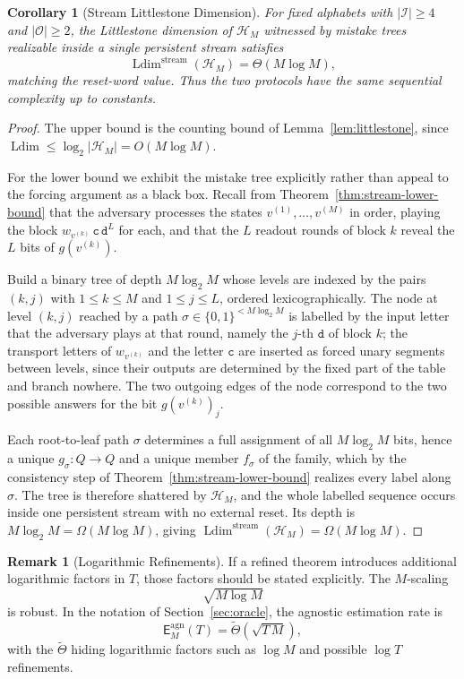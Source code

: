 \documentclass[12pt]{article}
\newtheorem{corollary}[theorem]{Corollary}
\theoremstyle{definition}
\newtheorem{remark}[theorem]{Remark}
\DeclareMathOperator{\Ldim}{Ldim}
\newcommand{\Est}{\mathsf E}
\begin{document}
\begin{corollary}[Stream Littlestone Dimension]
\label{cor:stream-ldim}
For fixed alphabets with $|\mathcal I|\ge4$ and $|\mathcal O|\ge2$, the
Littlestone dimension of $\mathcal H_M$ witnessed by mistake trees realizable
inside a single persistent stream satisfies
\[
\Ldim^{\mathrm{stream}}(\mathcal H_M)
=
\Theta(M\log M),
\]
matching the reset-word value.  Thus the two protocols have the same
sequential complexity up to constants.
\end{corollary}

\begin{proof}
The upper bound is the counting bound of Lemma~\ref{lem:littlestone}, since
$\Ldim\le\log_2|\mathcal H_M|=O(M\log M)$.

For the lower bound we exhibit the mistake tree explicitly rather than appeal
to the forcing argument as a black box.  Recall from
Theorem~\ref{thm:stream-lower-bound} that the adversary processes the states
$v^{(1)},\dots,v^{(M)}$ in order, playing the block
$w_{v^{(k)}}\,\mathtt c\,\mathtt d^{L}$ for each, and that the $L$ readout
rounds of block $k$ reveal the $L$ bits of $g(v^{(k)})$.

Build a binary tree of depth $M\log_2M$ whose levels are indexed by the pairs
$(k,j)$ with $1\le k\le M$ and $1\le j\le L$, ordered lexicographically.  The
node at level $(k,j)$ reached by a path $\sigma\in\{0,1\}^{<M\log_2M}$ is
labelled by the input letter that the adversary plays at that round, namely the
$j$-th $\mathtt d$ of block $k$; the transport letters of $w_{v^{(k)}}$ and the
letter $\mathtt c$ are inserted as forced unary segments between levels, since
their outputs are determined by the fixed part of the table and branch nowhere.
The two outgoing edges of the node correspond to the two possible answers for
the bit $g(v^{(k)})_j$.

Each root-to-leaf path $\sigma$ determines a full assignment of all
$M\log_2M$ bits, hence a unique $g_\sigma:Q\to Q$ and a unique member
$f_\sigma$ of the family, which by the consistency step of
Theorem~\ref{thm:stream-lower-bound} realizes every label along $\sigma$.  The
tree is therefore shattered by $\mathcal H_M$, and the whole labelled sequence
occurs inside one persistent stream with no external reset.  Its depth is
$M\log_2M=\Omega(M\log M)$, giving
$\Ldim^{\mathrm{stream}}(\mathcal H_M)=\Omega(M\log M)$.
\end{proof}

\begin{remark}[Logarithmic Refinements]
\label{rem:agnostic-log-factors}
If a refined theorem introduces additional logarithmic factors in $T$, those
factors should be stated explicitly.  The $M$-scaling
\[
\sqrt{M\log M}
\]
is robust.  In the notation of Section~\ref{sec:oracle}, the agnostic
estimation rate is
\[
\Est_M^{\mathrm{agn}}(T)
=
\widetilde\Theta\!\left(\sqrt{T\,M}\right),
\]
with the $\widetilde\Theta$ hiding logarithmic factors such as $\log M$ and
possible $\log T$ refinements.
\end{remark}
\end{document}

